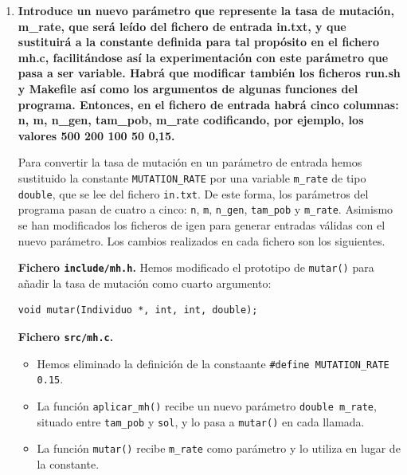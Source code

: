 \documentclass[12pt]{article}
\begin{document}
\begin{enumerate}
\begin{lstlisting}[style=EstiloC]

double distancia_ij(const double *d, int i, int j, int n)
{
    // Devuelve la distancia entre dos elementos i, j de la matriz 'd'
	// Formula de K
	//Agregamos este if para comprobar porque la formula solo es valida con i < j, 
	//el if garantiza que siempre se cumpla i < j, que es la condicion de validez 
	//de la formula, y que es correcto porque la distancia es simetrica
	if (i > j) { int t = i; i = j; j = t; }
	int val = (((n * n)- n)/2)-((((n-i)*(n-i))-(n-i))/2)+j-i-1;
	return d[val];
}
\end{lstlisting}


    \item \textbf{Introduce un nuevo parámetro que represente la tasa de mutación, m\_rate, que será leído del
fichero de entrada in.txt, y que sustituirá a la constante definida para tal propósito en el
fichero mh.c, facilitándose así la experimentación con este parámetro que pasa a ser variable.
Habrá que modificar también los ficheros run.sh y Makefile así como los argumentos de
algunas funciones del programa. Entonces, en el fichero de entrada habrá cinco columnas: n,
m, n\_gen, tam\_pob, m\_rate codificando, por ejemplo, los valores 500 200 100 50 0,15.}


Para convertir la tasa de mutación en un parámetro de entrada hemos sustituido la constante \texttt{MUTATION\_RATE} por una variable \texttt{m\_rate} de tipo \texttt{double}, que se lee del fichero \texttt{in.txt}.
De este forma, los parámetros del programa pasan de cuatro a cinco: \texttt{n}, \texttt{m}, \texttt{n\_gen}, \texttt{tam\_pob} y \texttt{m\_rate}. 
Asimismo se han modificados los ficheros de igen para generar entradas válidas con el nuevo parámetro.
Los cambios realizados en cada fichero son los siguientes.

\textbf{Fichero \texttt{include/mh.h}.} Hemos modificado el prototipo de \texttt{mutar()} para añadir la tasa de mutación como cuarto argumento:

\begin{verbatim}
void mutar(Individuo *, int, int, double);
\end{verbatim}

\textbf{Fichero \texttt{src/mh.c}.}

\begin{itemize}
    \item Hemos eliminado la definición de la constaante \texttt{\#define MUTATION\_RATE 0.15}.
    \item La función \texttt{aplicar\_mh()} recibe un nuevo parámetro \texttt{double m\_rate}, situado entre \texttt{tam\_pob} y \texttt{sol}, y lo pasa a \texttt{mutar()} en cada llamada.
    \item La función \texttt{mutar()} recibe \texttt{m\_rate} como parámetro y lo utiliza en lugar de la constante.
\end{itemize}


\end{enumerate}
\end{document}
